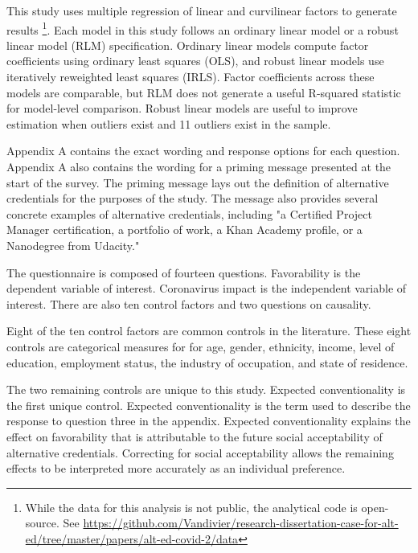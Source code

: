 \documentclass[review]{elsarticle}
\begin{document}
This study uses multiple regression of linear and curvilinear factors to generate results
\footnote{
    While the data for this analysis is not public, the analytical code is open-source.
    See \url{https://github.com/Vandivier/research-dissertation-case-for-alt-ed/tree/master/papers/alt-ed-covid-2/data}
}.
Each model in this study follows an ordinary linear model or a robust linear model (RLM) specification.
Ordinary linear models compute factor coefficients using ordinary least squares (OLS),
and robust linear models use iteratively reweighted least squares (IRLS).
Factor coefficients across these models are comparable,
but RLM does not generate a useful R-squared statistic
for model-level comparison.
Robust linear models are useful to improve estimation when outliers exist\cite{sievers2004rank}
and 11 outliers exist in the sample.

Appendix A contains the exact wording and response options for each question.
Appendix A also contains the wording for a priming message presented at the start of the survey.
The priming message lays out the definition of alternative credentials for the purposes of the study.
The message also provides several concrete examples of alternative credentials,
including "a Certified Project Manager certification,
a portfolio of work, a Khan Academy profile, or a Nanodegree from Udacity."

The questionnaire is composed of fourteen questions.
Favorability is the dependent variable of interest.
Coronavirus impact is the independent variable of interest.
There are also ten control factors and two questions on causality.

Eight of the ten control factors are common controls in the literature.
These eight controls are categorical measures for
for age, gender, ethnicity, income,
level of education, employment status, the industry of occupation, and state of residence.

The two remaining controls are unique to this study.
Expected conventionality is the first unique control.
Expected conventionality is the term used to describe the response to question three in the appendix.
Expected conventionality explains the effect on favorability that is
attributable to the future social acceptability of alternative credentials.
Correcting for social acceptability allows the remaining effects to be interpreted more accurately as an individual preference.
\end{document}
